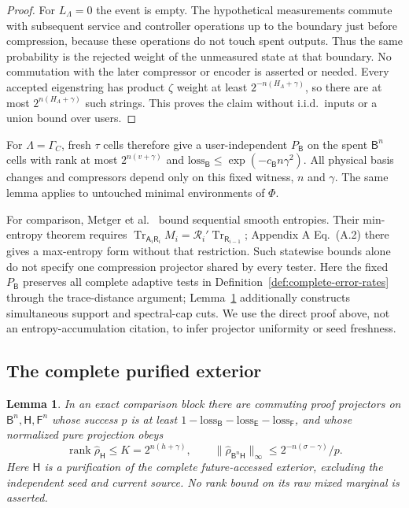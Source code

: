 \documentclass[11pt,a4paper]{article}
\numberwithin{equation}{section}
\theoremstyle{plain}
\newtheorem{lemma}[theorem]{Lemma}
\theoremstyle{definition}
\DeclareMathOperator{\Tr}{Tr}
\DeclareMathOperator{\rank}{rank}
\newcommand{\rg}[1]{\mathsf{#1}}
\begin{document}
\begin{proof}
For $L_\Lambda=0$ the event is empty. The hypothetical measurements commute
with subsequent service and controller operations up to the boundary just
before compression, because these operations do not touch spent outputs.
Thus the same probability is the rejected weight of the unmeasured state
at that boundary. No commutation with the later compressor or encoder is
asserted or needed. Every
accepted eigenstring has product $\zeta$ weight at least
$2^{-n(H_\Lambda+\gamma)}$, so there are at most $2^{n(H_\Lambda+\gamma)}$
such strings. This proves the claim without i.i.d.\ inputs or a union bound
over users.
\end{proof}

For $\Lambda=\Gamma_C$, fresh $\tau$ cells therefore give a user-independent
$P_{\rg{B}}$ on the spent $\rg{B}^n$ cells with rank at most
$2^{n(v+\gamma)}$ and $\mathrm{loss}_{\rg{B}}\le\exp(-c_{\rg{B}}n\gamma^2)$.
All physical basis changes and compressors depend only on this fixed witness,
$n$ and $\gamma$. The same lemma applies to untouched minimal environments of
$\Phi$.

For comparison, Metger et al.\ \cite[Theorem 4.1 and Appendix A]{Metger2024}
bound sequential
smooth entropies. Their min-entropy theorem requires
$\Tr_{\rg{A}_i\rg{R}_i}M_i=\mathcal{R}_i'\Tr_{\rg{R}_{i-1}}$; Appendix A
Eq.~(A.2) there gives a max-entropy form without that restriction. Such
statewise bounds alone do not specify one compression projector shared by
every tester. Here the fixed $P_{\rg{B}}$ preserves all complete adaptive
tests in Definition~\ref{def:complete-error-rates} through the trace-distance
argument; Lemma~\ref{lem:exterior-cuts} additionally constructs simultaneous
support and spectral-cap cuts. We use the direct proof above, not an
entropy-accumulation citation, to infer projector uniformity or seed
freshness.

\subsection{The complete purified exterior}

\begin{lemma}
\label{lem:exterior-cuts}
In an exact comparison block there are commuting proof projectors on
$\rg{B}^n,\rg{H},\rg{F}^n$ whose success $p$ is at least
$1-\mathrm{loss}_{\rg{B}}-\mathrm{loss}_{\rg{E}}-\mathrm{loss}_{\rg{F}}$, and
whose normalized pure projection obeys
\[
\rank\hat\rho_{\rg{H}}\le K=2^{n(h+\gamma)},
\qquad
\lVert\hat\rho_{\rg{B}^n\rg{H}}\rVert_\infty\le 2^{-n(\sigma-\gamma)}/p .
\]
Here $\rg{H}$ is a purification of the \emph{complete} future-accessed
exterior, excluding the independent seed and current source. No rank bound on
its raw mixed marginal is asserted.
\end{lemma}
\end{document}
